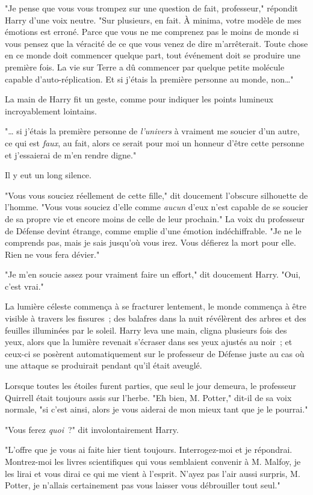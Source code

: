 "Je pense que vous vous trompez sur une question de fait, professeur," répondit Harry d'une voix neutre. "Sur plusieurs, en fait. À minima, votre modèle de mes émotions est erroné. Parce que vous ne me comprenez pas le moins de monde si vous pensez que la véracité de ce que vous venez de dire m'arrêterait. Toute chose en ce monde doit commencer quelque part, tout événement doit se produire une première fois. La vie sur Terre a dû commencer par quelque petite molécule capable d'auto-réplication. Et si j'étais la première personne au monde, non…"

La main de Harry fit un geste, comme pour indiquer les points lumineux incroyablement lointains.

"… si j'étais la première personne de \emph{l'univers} à vraiment me soucier d'un autre, ce qui est \emph{faux}, au fait, alors ce serait pour moi un honneur d'être cette personne et j'essaierai de m'en rendre digne."

Il y eut un long silence.

"Vous vous souciez réellement de cette fille," dit doucement l'obscure silhouette de l'homme. "Vous vous souciez d'elle comme \emph{aucun} d'eux n'est capable de se soucier de sa propre vie et encore moins de celle de leur prochain." La voix du professeur de Défense devint étrange, comme emplie d'une émotion indéchiffrable. "Je ne le comprends pas, mais je sais jusqu'où vous irez. Vous défierez la mort pour elle. Rien ne vous fera dévier."

"Je m'en soucie assez pour vraiment faire un effort," dit doucement Harry. "Oui, c'est vrai."

La lumière céleste commença à se fracturer lentement, le monde commença à être visible à travers les fissures~; des balafres dans la nuit révélèrent des arbres et des feuilles illuminées par le soleil. Harry leva une main, cligna plusieurs fois des yeux, alors que la lumière revenait s'écraser dans ses yeux ajustés au noir~; et ceux-ci se posèrent automatiquement sur le professeur de Défense juste au cas où une attaque se produirait pendant qu'il était aveuglé.

Lorsque toutes les étoiles furent parties, que seul le jour demeura, le professeur Quirrell était toujours assis sur l'herbe. "Eh bien, M. Potter," dit-il de sa voix normale, "si c'est ainsi, alors je vous aiderai de mon mieux tant que je le pourrai."

"Vous ferez \emph{quoi}~?" dit involontairement Harry.

"L'offre que je vous ai faite hier tient toujours. Interrogez-moi et je répondrai. Montrez-moi les livres scientifiques qui vous semblaient convenir à M. Malfoy, je les lirai et vous dirai ce qui me vient à l'esprit. N'ayez pas l'air aussi surpris, M. Potter, je n'allais certainement pas vous laisser vous débrouiller tout seul."

